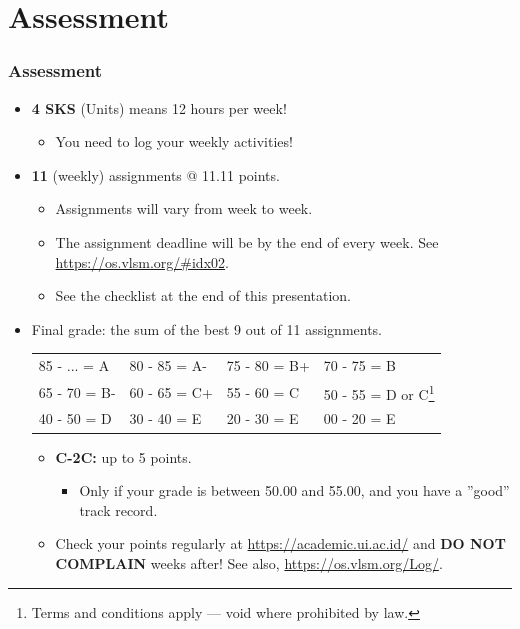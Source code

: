 \documentclass[xcolor=table, notheorems, hyperref={pdfpagelabels=false}]{beamer}
\begin{document}
\section{Assessment}
\begin{frame}
\frametitle{Assessment}
\begin{itemize}
\item \textbf{4 SKS} (Units) means 12 hours per week!
\begin{itemize}
\item You need to log your weekly activities!
\end{itemize}
\item \textbf{11} (weekly) assignments @ 11.11 points.
\begin{itemize}
\item Assignments will vary from week to week.
\item The assignment deadline will be by the end of every week. 
See \url{https://os.vlsm.org/\#idx02}.
\item See the checklist at the end of this presentation.
\end{itemize}
\item Final grade: the sum of the best 9 out of 11 assignments.
\begin{tabular}{l l l l}
\hline
85 - ... = A & 80 - 85 = A- & 75 - 80 = B+ & 70 - 75 = B \\
65 - 70 = B-      & 60 - 65 = C+ & 55 - 60 = C  & 
50 - 55 = D or C\footnote{Terms and conditions apply --- void where prohibited by law.}  \\
40 - 50 = D  & 30 - 40 = E  & 20 - 30 = \small E & 00 - 20 = \tiny E   \\
\hline
\end{tabular}

\begin{itemize}
\item \textbf{C-2C:} up to 5 points.
\begin{itemize}
\item Only if your grade is between 50.00 and 55.00, and you have a ''good'' track record.
\end{itemize}
\item Check your points regularly at \url{https://academic.ui.ac.id/} and 
      \textbf{DO NOT COMPLAIN} weeks after! See also, \url{https://os.vlsm.org/Log/}.
\end{itemize}
\end{itemize}

\end{frame}
\end{document}
